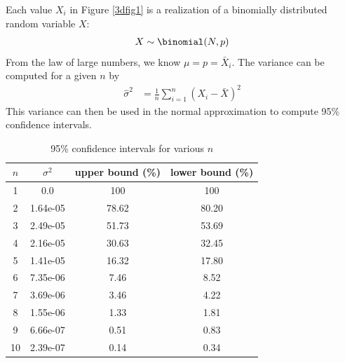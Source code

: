 \documentclass[11pt]{article}
\begin{document}
Each value $X_i$ in Figure \ref{3dfig1} is a realization of a binomially distributed
random variable $X$:
\begin{align*}
    X \sim \binomial(N, p)
\end{align*}
From the law of large numbers, we know $\mu = p = \bar{X}_i$.
The variance can be computed for a given $n$ by
\begin{align*}
    \hat{\sigma}^2 &= \frac{1}{n} \sum_{i=1}^{n} \left(X_i - \bar{X}\right)^2
\end{align*}
This variance can then be used in the normal approximation to compute 95\%
confidence intervals.

\begin{mdframed}
\begin{table}[H]
    \centering
    \caption{95\% confidence intervals for various $n$}
    \begin{tabular}{cccc}
        \hline\hline
        $n$ & $\sigma^2$ & upper bound (\%) & lower bound (\%) \\
        \hline
        1  & 0.0      & 100   & 100   \\
        2  & 1.64e-05 & 78.62 & 80.20 \\
        3  & 2.49e-05 & 51.73 & 53.69 \\
        4  & 2.16e-05 & 30.63 & 32.45 \\
        5  & 1.41e-05 & 16.32 & 17.80 \\
        6  & 7.35e-06 & 7.46  & 8.52  \\
        7  & 3.69e-06 & 3.46  & 4.22  \\
        8  & 1.55e-06 & 1.33  & 1.81  \\
        9  & 6.66e-07 & 0.51  & 0.83  \\
        10 & 2.39e-07 & 0.14  & 0.34  \\
        \hline\hline
    \end{tabular}
    \label{3etab1}
\end{table}
\end{mdframed}
\end{document}
